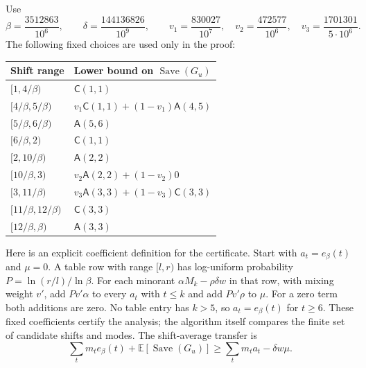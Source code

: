 Use
\[
 \beta=\frac{3512863}{10^6},\qquad
 \delta=\frac{144136826}{10^9},\qquad
 v_1=\frac{830027}{10^7},\quad
 v_2=\frac{472577}{10^6},\quad
 v_3=\frac{1701301}{5\cdot10^6}.
\]
The following fixed choices are used only in the proof:
\begin{center}
\small
\begin{tabular}{ll}
\hline
Shift range & Lower bound on $\operatorname{Save}(G_u)$\\
\hline
$[1,4/\beta)$ & $\mathsf C(1,1)$\\
$[4/\beta,5/\beta)$ & $v_1\mathsf C(1,1)+(1-v_1)\mathsf A(4,5)$\\
$[5/\beta,6/\beta)$ & $\mathsf A(5,6)$\\
$[6/\beta,2)$ & $\mathsf C(1,1)$\\
$[2,10/\beta)$ & $\mathsf A(2,2)$\\
$[10/\beta,3)$ & $v_2\mathsf A(2,2)+(1-v_2)0$\\
$[3,11/\beta)$ & $v_3\mathsf A(3,3)+(1-v_3)\mathsf C(3,3)$\\
$[11/\beta,12/\beta)$ & $\mathsf C(3,3)$\\
$[12/\beta,\beta)$ & $\mathsf A(3,3)$\\
\hline
\end{tabular}
\end{center}

Here is an explicit coefficient definition for the certificate. Start
with $a_t=e_\beta(t)$ and $\mu=0$. A table row with range $[l,r)$
has log-uniform probability $P=\ln(r/l)/\ln\beta$. For each
minorant $\alpha M_k-\rho\delta w$ in that row, with mixing weight
$v'$, add $Pv'\alpha$ to every $a_t$ with $t\le k$ and add
$Pv'\rho$ to $\mu$. For a zero term both additions are zero.
No table entry has $k>5$, so $a_t=e_\beta(t)$ for $t\ge6$.
These fixed coefficients certify the analysis; the algorithm itself
compares the finite set of candidate shifts and modes.
The shift-average transfer is
\[
 \sum_t m_t e_\beta(t)+\mathbb E[\operatorname{Save}(G_u)]
 \ge\sum_t m_t a_t-\delta w\mu.
\]

